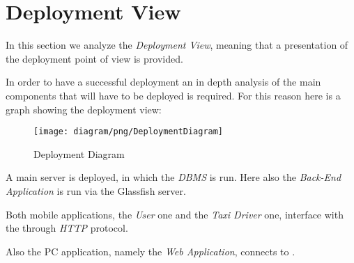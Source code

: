 \newpage

\section{Deployment View} %
\label{sec:deployment_view}

In this section we analyze the \emph{Deployment View}, meaning that a presentation of the deployment point of view is provided.

In order to have a successful deployment an in depth analysis of the main components that will have to be deployed is required.
For this reason here is a graph showing the deployment view:
\newpage
\begin{figure}[h!t]
\caption{Deployment Diagram}
\texttt{[image: diagram/png/DeploymentDiagram]}
\centering
\end{figure}
\newpage

A main server is deployed, in which the \emph{DBMS} is run. Here also the \emph{Back-End Application} is run via the Glassfish server.

Both mobile applications, the \emph{User} one and the \emph{Taxi Driver} one, interface with the \emph{} through \emph{HTTP} protocol.

Also the PC application, namely the \emph{Web Application}, connects to \emph{}.
